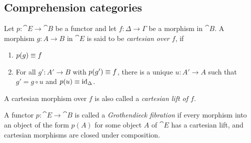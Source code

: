 \begin{comment}
Note first that for any $A\in\cat{F}/\Gamma$, $W_A$ is
contravariant in $A$ and that it preserves the terminal object. 

Now let $\theta:\Delta\to\ctxext{\Gamma}{A}$ so that $A\circ\theta\jdeq f$
for some $f:\Delta\to\Gamma$. Then we have $\zeta_{A,f}(\theta)\in T(f_\ast(A))$.  
We wish to define $\theta_\ast(\idtm{A}):\Delta\to\ctxext{\Delta}{f_\ast(A)}$

for any $A\in\cat{F}/\Gamma$ and $Q\in\cat{F}/\ctxext{\Gamma}{B}$, we have
\begin{align*}
T(B) 
  & \jdeq 
\{ \eta : \Gamma \to\ctxext{\Gamma}{B}
        \mid B\circ\eta\jdeq\catid{\Gamma}\}
  \\
T(W_A(B))
  & \jdeq
\{ \eta : \ctxext{\Gamma}{A}\to\ctxext{{\Gamma}{A}}{W_A(B)}
        \mid W_A(B)\circ\eta\jdeq\catid{\ctxext{\Gamma}{A}}\}
  \\
  & \cong
\{ \theta : \ctxext{\Gamma}{A}\to\ctxext{\Gamma}{B}\mid B\circ\theta\jdeq A\}
\end{align*}
Therefore, $\eta\mapsto \zeta_{B,A}(\eta\circ A)$ defines a function from
$T(B)$ to $T(W_A(B))$. 
\end{proof}
\end{comment}

\subsection{Comprehension categories}

\begin{defn}
Let $p:\cat{E}\to\cat{B}$ be a functor and let $f:\Delta\to \Gamma$ be a morphism in $\cat{B}$.
A morphism $g:A\to B$ in $\cat{E}$ is said to be \emph{cartesian over $f$}, if
\begin{enumerate}
\item $p(g)\equiv f$
\item For all $g':A'\to B$ with $p(g')\equiv f$, there is a unique $u:A'\to A$
such that $g'=g\circ u$ and $p(u)\equiv{\mathrm{id}_{\Delta}}$. 
\end{enumerate}
A cartesian morphism over $f$ is also called a \emph{cartesian lift of $f$}.
\end{defn}

\begin{defn}
A functor $p:\cat{E}\to\cat{B}$ is called a \emph{Grothendieck fibration} if
every morphism into an object of the form $p(A)$ for some object $A$ of $\cat{E}$ 
has a cartesian lift, and cartesian morphisms are closed under composition.
\end{defn}

